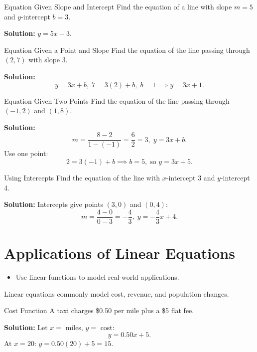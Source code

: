 \begin{example}{Equation Given Slope and Intercept}\label{exa:eq-slope-int}
Find the equation of a line with slope \(m=5\) and $y$-intercept \(b=3\).

\textbf{Solution:} \(y=5x+3.\)
\end{example}

\begin{example}{Equation Given a Point and Slope}\label{exa:eq-point-slope}
Find the equation of the line passing through \((2,7)\) with slope \(3\).

\textbf{Solution:}
\[
y=3x+b,\; 7=3(2)+b,\; b=1 \implies y=3x+1.
\]
\end{example}

\begin{example}{Equation Given Two Points}\label{exa:eq-two-points}
Find the equation of the line passing through \((-1,2)\) and \((1,8)\).

\textbf{Solution:}
\[
m=\frac{8-2}{1-(-1)}=\frac{6}{2}=3,\; y=3x+b.
\]
Use one point:
\[
2=3(-1)+b \implies b=5,\; \text{so } y=3x+5.
\]
\end{example}

\begin{example}{Using Intercepts}\label{exa:eq-from-intercepts}
Find the equation of the line with $x$-intercept 3 and $y$-intercept 4.

\textbf{Solution:} Intercepts give points $(3,0)$ and $(0,4)$:
\[
m=\frac{4-0}{0-3}=-\frac{4}{3},\;y=-\frac{4}{3}x+4.
\]
\end{example}

\section{Applications of Linear Equations}
\begin{outcome}
\begin{itemize}
\item Use linear functions to model real-world applications.
\end{itemize}
\end{outcome}

Linear equations commonly model cost, revenue, and population changes.

\begin{example}{Cost Function}\label{exa:cost-function}
A taxi charges \$0.50 per mile plus a \$5 flat fee.

\textbf{Solution:} Let $x=$ miles, $y=$ cost:
\[
y=0.50x+5.
\]
At $x=20$: $y=0.50(20)+5=15.$
\end{example}


